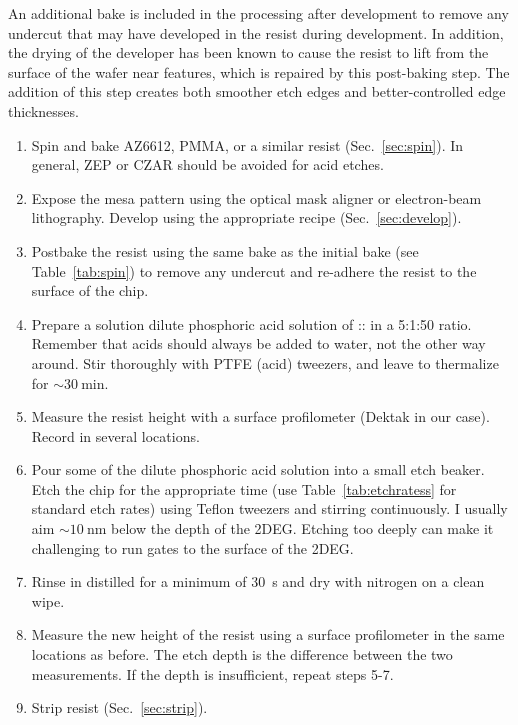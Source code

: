 An additional bake is included in the processing after development to remove any undercut that may have developed in the resist during development.
In addition, the drying of the developer has been known to cause the resist to lift from the surface of the wafer near features, which is
repaired by this post-baking step. The addition of this step creates both smoother etch edges and better-controlled edge thicknesses.

\begin{enumerate}
    \item Spin and bake AZ6612, PMMA, or a similar resist (Sec.~\ref{sec:spin}). In general, ZEP or CZAR should be avoided for acid etches.
    \item Expose the mesa pattern using the optical mask aligner or electron-beam lithography. Develop using the appropriate recipe (Sec.~\ref{sec:develop}).
    \item Postbake the resist using the same bake as the initial bake (see Table~\ref{tab:spin}) to remove any undercut and re-adhere the resist to the surface of the chip.
    \item Prepare a solution dilute phosphoric acid solution of :: in a 5:1:50 ratio. Remember that acids should always be added to water, not the other way around. Stir thoroughly with PTFE (acid) tweezers, and leave to thermalize for $\sim \SI{30}{\minute}$.
    \item Measure the resist height with a surface profilometer (Dektak in our case). Record in several locations.
    \item Pour some of the dilute phosphoric acid solution into a small etch beaker. Etch the chip for the appropriate time (use Table~\ref{tab:etchratess} for standard etch rates) using Teflon tweezers and stirring continuously. I usually aim $\sim \SI{10}{\nano\meter}$ below the depth of the 2DEG. Etching too deeply can make it challenging to run gates to the surface of the 2DEG.
    \item Rinse in distilled  for a minimum of \SI{30}{\second} and dry with nitrogen on a clean wipe.
    \item Measure the new height of the resist using a surface profilometer in the same locations as before. The etch depth is the difference between the two measurements. If the depth is insufficient, repeat steps 5-7.
    \item Strip resist (Sec.~\ref{sec:strip}).
\end{enumerate}

